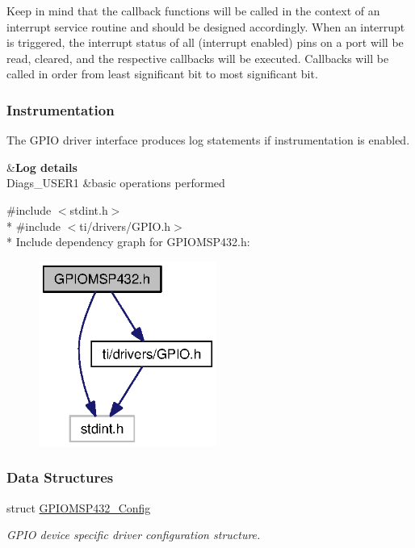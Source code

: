 Keep in mind that the callback functions will be called in the context of an interrupt service routine and should be designed accordingly. When an interrupt is triggered, the interrupt status of all (interrupt enabled) pins on a port will be read, cleared, and the respective callbacks will be executed. Callbacks will be called in order from least significant bit to most significant bit.

\subsubsection*{Instrumentation}

The G\+P\+I\+O driver interface produces log statements if instrumentation is enabled.

\begin{TabularC}{2}
\hline
{}&{\bf Log details  }\\
Diags\+\_\+\+U\+S\+E\+R1 &basic operations performed \\
\end{TabularC}


{\ttfamily \#include $<$stdint.\+h$>$}\\*
{\ttfamily \#include $<$ti/drivers/\+G\+P\+I\+O.\+h$>$}\\*
Include dependency graph for G\+P\+I\+O\+M\+S\+P432.\+h\+:
\nopagebreak
\begin{figure}[H]
\begin{center}
\leavevmode
\includegraphics[width=165pt]{_g_p_i_o_m_s_p432_8h__incl}
\end{center}
\end{figure}
\subsubsection*{Data Structures}
\begin{DoxyCompactItemize}
\item 
struct \hyperlink{struct_g_p_i_o_m_s_p432___config}{G\+P\+I\+O\+M\+S\+P432\+\_\+\+Config}
\begin{DoxyCompactList}\small\item\em G\+P\+I\+O device specific driver configuration structure. \end{DoxyCompactList}\end{DoxyCompactItemize}
